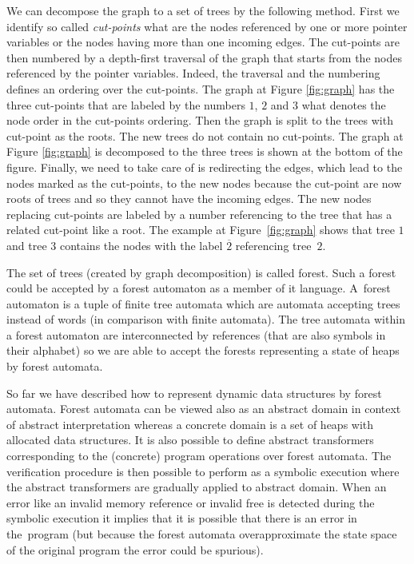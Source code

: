 \documentclass[fleqn,11pt]{ExcelAtFIT} %
\begin{document}
We can decompose the graph to a set of trees by the following method.
First we identify so called \emph{cut-points} what are the nodes referenced by
one or more pointer variables or the nodes having more than one incoming edges.
The cut-points are then numbered by a depth-first traversal of the graph that starts from
the nodes referenced by the pointer variables.
Indeed, the traversal and the numbering defines an ordering over the cut-points.
The graph at Figure \ref{fig:graph} has the three cut-points that are labeled by the numbers $1$,
$2$ and $3$ what denotes the node order in the cut-points ordering.
Then the graph is split to the trees with cut-point as the roots.
The new trees do not contain no cut-points.
The graph at Figure \ref{fig:graph} is decomposed to the three trees is shown at the bottom of the figure.
Finally, we need to take care of is redirecting the edges, which lead to the nodes
marked as the cut-points, to the new nodes because the cut-point are now roots of trees and
so they cannot have the incoming edges.
The new nodes replacing cut-points are labeled by a number referencing to the tree that has a related cut-point like a root.
The example at Figure~\ref{fig:graph} shows that tree $1$ and tree $3$ contains the nodes with the label $\overline{2}$
referencing tree~$2$.

The set of trees (created by graph decomposition) is called forest.
Such a forest could be accepted by a forest automaton as a member of it language.
A~forest automaton is a tuple of finite tree automata which are automata accepting trees instead of words (in comparison with finite automata).
The tree automata within a forest automaton are interconnected by references (that are also symbols in their alphabet)
so we are able to accept the forests representing a state of heaps by forest automata.

So far we have described how to represent dynamic data structures by forest automata.
Forest automata can be viewed also as an abstract domain in context of abstract interpretation
whereas a concrete domain is a set of heaps with allocated data structures.
It is also possible to define abstract transformers corresponding to the (concrete) program operations over forest automata.
The verification procedure is then possible to perform as a symbolic execution
where the abstract transformers are gradually applied to abstract domain.
When an error like an invalid memory reference or invalid free is detected during the symbolic
execution it implies that it is possible that there is an error in the~program (but because
the forest automata overapproximate the state space of the original program the error could be spurious).
\end{document}
